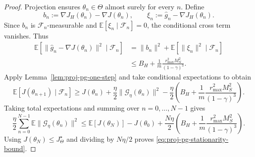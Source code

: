 \documentclass{article}
\theoremstyle{definition}
\theoremstyle{remark}
\newtheorem*{remark}{Remark}
\theoremstyle{mystyle}
\newcommand{\1}{\mathbbm{1}}
\begin{document}
\begin{proof}
Projection ensures $\theta_n\in\Theta$ almost surely for every $n$.
Define
\[
b_n:=\nabla J_H(\theta_n)-\nabla J(\theta_n),
\qquad
\xi_n:=\widehat g_n-\nabla J_H(\theta_n).
\]
Since $b_n$ is $\mathcal{F}_n$-measurable and
$\mathbb E[\xi_n\mid\mathcal{F}_n]=0$, the conditional cross term
vanishes. Thus
\begin{align*}
\mathbb E\!\left[
 \|\widehat g_n-\nabla J(\theta_n)\|^2
 \mid\mathcal{F}_n\right]
&=\|b_n\|^2+
  \mathbb E[\|\xi_n\|^2\mid\mathcal{F}_n]\\
&\le B_H+\frac{1}{m}\frac{r_{\max}^2M_S^2}
{(1-\gamma)^3}.
\end{align*}
Apply Lemma~\ref{lem:proj-pg-one-step} and take conditional
expectations to obtain
\[
\mathbb E[J(\theta_{n+1})\mid\mathcal{F}_n]
\ge J(\theta_n)
  +\frac{\eta}{2}\|\mathcal G_\eta(\theta_n)\|^2
  -\frac{\eta}{2}\left(B_H+\frac{1}{m}\frac{r_{\max}^2M_S^2}
{(1-\gamma)^3}\right).
\]
Taking total expectations and summing over $n=0,\ldots,N-1$ gives
\[
\frac{\eta}{2}\sum_{n=0}^{N-1}
\mathbb E\|\mathcal G_\eta(\theta_n)\|^2
\le \mathbb E[J(\theta_N)]-J(\theta_0)
  +\frac{N\eta}{2}\left(B_H+\frac{1}{m}\frac{r_{\max}^2M_S^2}
{(1-\gamma)^3}\right).
\]
Using $J(\theta_N)\le J_\Theta^\star$ and dividing by $N\eta/2$
proves \eqref{eq:proj-pg-stationarity-bound}. 
\end{proof}


\end{document}
